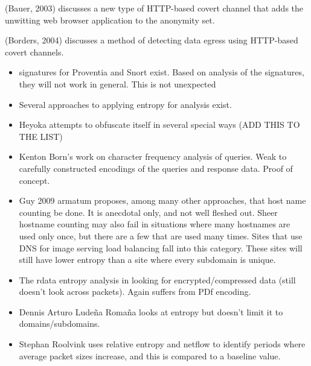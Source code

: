 \documentclass[12pt]{article}
\theoremstyle{remark}
\theoremstyle{definition}
\theoremstyle{definition}
\theoremstyle{definition}
\begin{document}
(Bauer, 2003)\cite{Bauer2003} discusses a new type of HTTP-based covert channel that adds the unwitting web browser application to the anonymity set.

(Borders, 2004)\cite{Borders2004} discusses a method of detecting data egress using HTTP-based covert channels.


\begin{itemize}
\item signatures for Proventia and Snort exist. Based on analysis of the signatures, they will not work in general. This is not unexpected
\item Several approaches to applying entropy for analysis exist.
\item Heyoka attempts to obfuscate itself in several special ways (ADD THIS TO THE LIST)
\item Kenton Born's work on character frequency analysis of queries. Weak to carefully constructed encodings of the queries and response data. Proof of concept.
\item Guy 2009 armatum proposes, among many other approaches, that host name counting be done. It is anecdotal only, and not well fleshed out. Sheer hostname counting may also fail in situations where many hostnames are used only once, but there are a few that are used many times. Sites that use DNS for image serving load balancing fall into this category. These sites will still have lower entropy than a site where every subdomain is unique.
\item The rdata entropy analysis in looking for encrypted/compressed data (still doesn't look across packets). Again suffers from PDf encoding.
\item Dennis Arturo Ludeña Romaña looks at entropy but doesn't limit it to domains/subdomains.
\item Stephan Roolvink uses relative entropy and netflow to identify periods where average packet sizes increase, and this is compared to a baseline value.
\end{itemize}

\newpage
\end{document}
